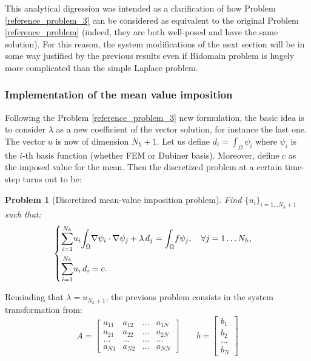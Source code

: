 \documentclass[a4paper,11pt]{article}
\newtheorem{problem}{Problem}
\begin{document}
	\vspace{3mm} 
	\noindent This analytical digression was intended as a clarification of how Problem \ref{reference_problem_3} can be considered as equivalent to the original Problem \ref{reference_problem} (indeed, they are both well-posed and have the same solution). For this reason, the system modifications of the next section will be in some way justified by the previous results even if Bidomain problem is hugely more complicated than the simple Laplace problem.


\subsubsection{Implementation of the mean value imposition} \label{mean_value_implementation}
\noindent Following the Problem \ref{reference_problem_3} new formulation, the basic idea is to consider $\lambda$ as a new coefficient of the vector solution, for instance the last one. The vector $u$ is now of dimension $N_h+1$. Let us define $d_i=\int_\Omega \psi_i$ where $\psi_i$ is the $i$-th basis function (whether FEM or Dubiner basis). Moreover, define $c$ as the imposed value for the mean. Then the discretized problem at a certain time-step turns out to be:

\begin{problem}[Discretized mean-value imposition problem]
	Find $\{u_i\}_{i=1\dots N_h+1}$ such that:
	\begin{equation*}
	\begin{cases}
	\mathlarger{\sum}_{i=1}^{N_h} u_i \mathlarger{\int}_{\Omega}\nabla\psi_i \cdot \nabla \psi_j + \lambda \,d_j=\mathlarger{\int}_{\Omega}f\psi_j, \quad \forall j=1\dots N_h, \\[3ex]
	\mathlarger{\sum}_{i=1}^{N_h} u_i \,d_i = c.
	\end{cases}
	\end{equation*}
\end{problem}
\vspace{3mm}
\noindent Reminding that $\lambda=u_{N_h+1}$, the previous problem consists in the system transformation from: \\
\begin{equation*}
A=\begin{bmatrix}
a_{11} & a_{12} & \dots & a_{1N} \\ 
a_{21} & a_{22} & \dots & a_{2N} \\ 
\dots & \dots & \dots & \dots \\
a_{N1}  & a_{N2} & \dots & a_{NN}
\end{bmatrix} \quad \quad
b=\begin{bmatrix}
b_1 \\ b_2 \\ \dots \\ b_N
\end{bmatrix}
\end{equation*}
\end{document}
